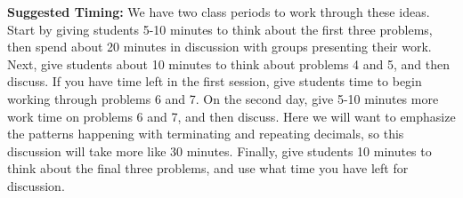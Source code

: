 \documentclass[noauthor, nooutcomes]{ximera}
\begin{document}
\begin{instructorNotes}
{\bf Suggested Timing:} We have two class periods to work through these ideas. Start by giving students 5-10 minutes to think about the first three problems, then spend about 20 minutes in discussion with groups presenting their work. Next, give students about 10 minutes to think about problems 4 and 5, and then discuss. If you have time left in the first session, give students time to begin working through problems 6 and 7. On the second day, give 5-10 minutes more work time on problems 6 and 7, and then discuss. Here we will want to emphasize the patterns happening with terminating and repeating decimals, so this discussion will take more like 30 minutes. Finally, give students 10 minutes to think about the final three problems, and use what time you have left for discussion.
\end{instructorNotes}
\end{document}
